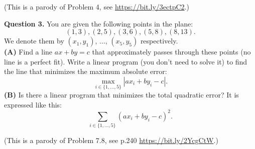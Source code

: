 \documentclass[jou]{apa6}
\begin{document}
(This is a parody of Problem 4, see \url{https://bit.ly/3ectpC2}.)





\vspace{10pt}
{\bf Question 3.} 
You are given the following points in the plane:
$$(1, 3), (2, 5), (3, 6), (5, 8), (8, 13).$$
We denote them by $(x_1,y_1)$, $\ldots$, $(x_5,y_5)$ respectively.\\
{\bf (A)} Find a line $ax + by = c$ that approximately passes through these points (no line is a
perfect fit). Write a linear program (you don't need to solve it) to find the line that minimizes the
maximum absolute error:
$$\max_{i \in \{1,\ldots,5\}} |ax_i + by_i - c|.$$
{\bf (B)} Is there a linear program that minimizes the total quadratic error? It is expressed like this:
$$\sum\limits_{i \in \{1,\ldots,5\}} (ax_i + by_i - c)^2.$$

(This is a parody of Problem 7.8, see p.240 \url{https://bit.ly/2YcgCtW}.)






\end{document}
